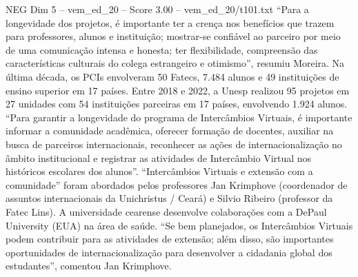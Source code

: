 \begin{textsample}{NEG Dim 5 – vem\_ed\_20 – Score 3.00 – vem\_ed\_20/t101.txt}  \label{ex:f5_neg_064}
“Para a longevidade dos projetos, é importante ter a crença nos benefícios que trazem para professores, alunos e instituição; mostrar-se confiável ao parceiro por meio de uma comunicação intensa e honesta; ter flexibilidade, compreensão das características culturais do colega estrangeiro e otimismo”, resumiu Moreira.
Na última década, os PCIs envolveram 50 Fatecs, 7.484 alunos e 49 instituições de ensino superior em 17 países.
Entre 2018 e 2022, a Unesp realizou 95 projetos em 27 unidades com 54 instituições parceiras em 17 países, envolvendo 1.924 alunos. “Para garantir a longevidade do programa de Intercâmbios Virtuais, é importante informar a comunidade acadêmica, oferecer formação de docentes, auxiliar na busca de parceiros internacionais, reconhecer as ações de internacionalização no âmbito institucional e registrar as atividades de Intercâmbio Virtual nos históricos escolares dos alunos”. “Intercâmbios Virtuais e extensão com a comunidade” foram abordados pelos professores Jan Krimphove (coordenador de assuntos internacionais da Unichristus / Ceará) e Silvio Ribeiro (professor da Fatec Lins).
A universidade cearense desenvolve colaborações com a DePaul University (EUA) na área de saúde. “Se bem planejados, os Intercâmbios Virtuais podem contribuir para as atividades de extensão; além disso, são importantes oportunidades de internacionalização para desenvolver a cidadania global dos estudantes”, comentou Jan Krimphove.

\end{textsample}
